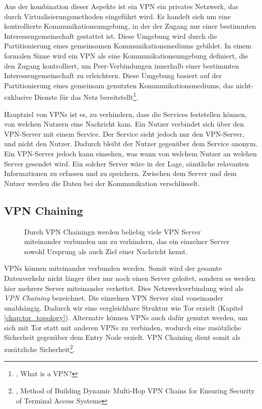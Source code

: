 Aus der kombination dieser Aspekte ist ein VPN ein privates Netzwerk, das durch Virtualisierungsmethoden eingeführt wird. Es handelt sich um eine kontrollierte Kommunikationsumgebung, in der der Zugang nur einer bestimmten Interessengemeinschaft gestattet ist. Diese Umgebung wird durch die Partitionierung eines gemeinsamen Kommunikationsmediums gebildet.
In einem formalen Sinne wird ein VPN als eine Kommunikationsumgebung definiert, die den Zugang kontrolliert, um Peer-Verbindungen innerhalb einer bestimmten Interessengemeinschaft zu erleichtern. Diese Umgebung basiert auf der Partitionierung eines gemeinsam genutzten Kommunikationsmediums, das nicht-exklusive Dienste für das Netz bereitstellt\footnote{\cite{DefinitionOfVPN}, What is a VPN?}.

Hauptziel von VPNs ist es, zu verhindern, dass die Services feststellen können, von welchen Nutzern eine Nachricht kam. Ein Nutzer verbindet sich über den VPN-Server mit einem Service. Der Service sieht jedoch nur den VPN-Server, und nicht den Nutzer. Dadurch bleibt der Nutzer gegenüber dem Service anonym.
Ein VPN-Server jedoch kann einsehen, was wann von welchem Nutzer an welchen Server gesendet wird. Ein solcher Server wäre in der Lage, sämtliche relavanten Informationen zu erfassen und zu speichern. Zwischen dem Server und dem Nutzer werden die Daten bei der Kommunikation verschlüsselt.

\subsection{VPN Chaining}
\label{chap:vpn_chaining}

\begin{figure}
    \centering
    
    \caption{Durch VPN Chainingn werden beliebig viele VPN Server miteinander verbunden um zu verhindern, das ein einzelner Server sowohl Ursprung als auch Ziel einer Nachricht kennt.}
    \label{imgs:vpn_chaining}
\end{figure}

VPNs können miteinander verbunden werden. Somit wird der gesamte Datenverkehr nicht länger über nur noch einen Server geleitet, sondern es werden hier mehrere Server miteinander verkettet. Dies Netzwerkverbindung wird als \textit{VPN Chaining} bezeichnet. Die einzelnen VPN Server sind voneinander unabhängig. Dadurch wir eine vergleichbare Struktur wie Tor erzielt (Kapitel \ref{chap:tor_topology}). Alternativ können VPNs auch dafür genutzt werden, um sich mit Tor statt mit anderen VPNs zu verbinden, wodurch eine zusätzliche Sicherheit gegenüber dem Entry Node erzielt. VPN Chaining dient somit als zusätzliche Sicherheit\footnote{\cite{VPNChains}, Method of Building Dynamic Multi-Hop VPN Chains for Ensuring Security of Terminal Access Systems}.

